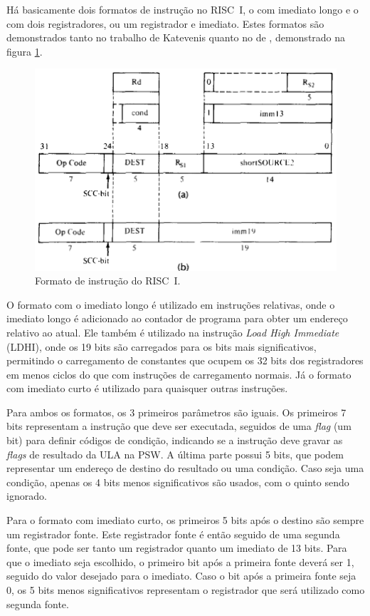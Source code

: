\documentclass[
	article,			%
	11pt,				%
	oneside,			%
	a4paper,			%
	english,			%
	brazil,				%
	sumario=tradicional
	]{abntex2}
\begin{document}
Há basicamente dois formatos de instrução no RISC~I, o com imediato longo e o com dois registradores, ou um registrador e imediato. Estes formatos são demonstrados tanto no trabalho de Katevenis quanto no de , demonstrado na figura \ref{fig:instructionFormat}. 
\begin{figure}[h]
    \centering
    \includegraphics[width=0.75\linewidth]{Original/InstructionFormatStallings.png}
    \caption{Formato de instrução do RISC~I\cite{stallings_reduced_1988}.}
    \label{fig:instructionFormat}
\end{figure}

O formato com o imediato longo é utilizado em instruções relativas, onde o imediato longo é adicionado ao contador de programa para obter um endereço relativo ao atual. Ele também é utilizado na instrução \textit{Load High Immediate} (LDHI), onde os 19 bits são carregados para os bits mais significativos, permitindo o carregamento de constantes que ocupem os 32 bits dos registradores em menos ciclos do que com instruções de carregamento normais. Já o formato com imediato curto é utilizado para quaisquer outras instruções.

Para ambos os formatos, os 3 primeiros parâmetros são iguais. Os primeiros 7 bits representam a instrução que deve ser executada, seguidos de uma \textit{flag} (um bit) para definir códigos de condição, indicando se a instrução deve gravar as \textit{flags} de resultado da ULA na PSW. A última parte possui 5 bits, que podem representar um endereço de destino do resultado ou uma condição. Caso seja uma condição, apenas os 4 bits menos significativos são usados, com o quinto sendo ignorado.

Para o formato com imediato curto, os primeiros 5 bits após o destino são sempre um registrador fonte. Este registrador fonte é então seguido de uma segunda fonte, que pode ser tanto um registrador quanto um imediato de 13 bits. Para que o imediato seja escolhido, o primeiro bit após a primeira fonte deverá ser 1, seguido do valor desejado para o imediato. Caso o bit após a primeira fonte seja 0, os 5 bits menos significativos representam o registrador que será utilizado como segunda fonte.
\end{document}
